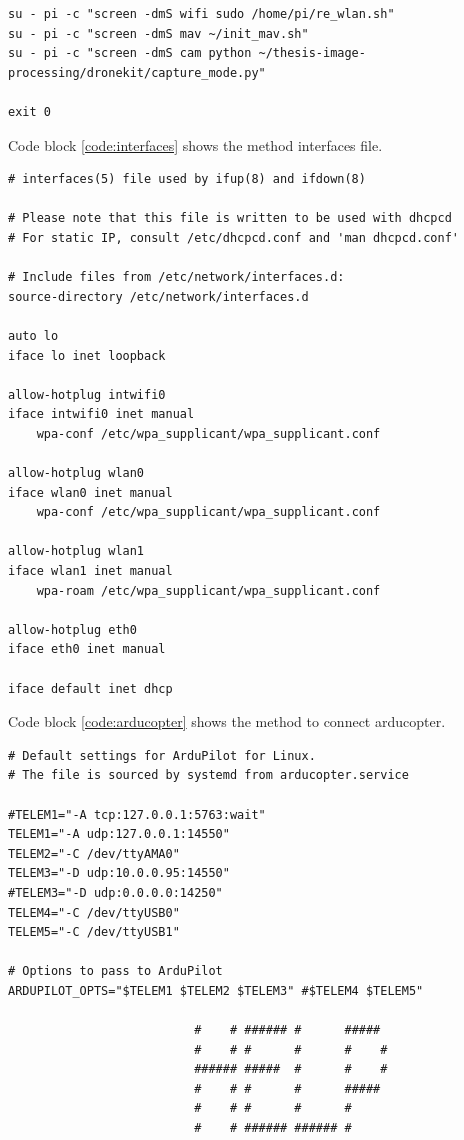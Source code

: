 \begin{appendices}
\begin{lstlisting}
su - pi -c "screen -dmS wifi sudo /home/pi/re_wlan.sh"
su - pi -c "screen -dmS mav ~/init_mav.sh"
su - pi -c "screen -dmS cam python ~/thesis-image-processing/dronekit/capture_mode.py"

exit 0

\end{lstlisting}

Code block \ref{code:interfaces} shows the method interfaces file.

\begin{lstlisting}
# interfaces(5) file used by ifup(8) and ifdown(8)

# Please note that this file is written to be used with dhcpcd
# For static IP, consult /etc/dhcpcd.conf and 'man dhcpcd.conf'

# Include files from /etc/network/interfaces.d:
source-directory /etc/network/interfaces.d

auto lo
iface lo inet loopback

allow-hotplug intwifi0
iface intwifi0 inet manual
    wpa-conf /etc/wpa_supplicant/wpa_supplicant.conf

allow-hotplug wlan0
iface wlan0 inet manual
    wpa-conf /etc/wpa_supplicant/wpa_supplicant.conf

allow-hotplug wlan1
iface wlan1 inet manual
    wpa-roam /etc/wpa_supplicant/wpa_supplicant.conf

allow-hotplug eth0
iface eth0 inet manual

iface default inet dhcp

\end{lstlisting}

Code block \ref{code:arducopter} shows the method to connect arducopter.

\begin{lstlisting}
# Default settings for ArduPilot for Linux.
# The file is sourced by systemd from arducopter.service

#TELEM1="-A tcp:127.0.0.1:5763:wait"
TELEM1="-A udp:127.0.0.1:14550"
TELEM2="-C /dev/ttyAMA0"
TELEM3="-D udp:10.0.0.95:14550"
#TELEM3="-D udp:0.0.0.0:14250"
TELEM4="-C /dev/ttyUSB0"
TELEM5="-C /dev/ttyUSB1"

# Options to pass to ArduPilot
ARDUPILOT_OPTS="$TELEM1 $TELEM2 $TELEM3" #$TELEM4 $TELEM5"

                          #    # ###### #      #####
                          #    # #      #      #    #
                          ###### #####  #      #    #
                          #    # #      #      #####
                          #    # #      #      #
                          #    # ###### ###### #


\end{lstlisting}
\end{appendices}
